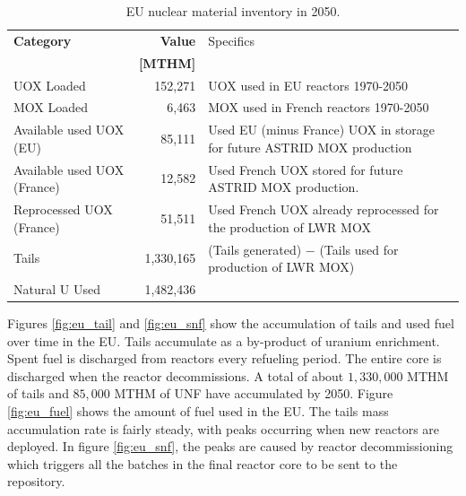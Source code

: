 \begin{table}[h]
	\centering
        \caption{\gls{EU} nuclear material inventory in 2050.}
\begin{tabularx}{\textwidth}{XrX}
			\hline
                        \textbf{Category} & \textbf{Value} & Specifics \\
                                          & \textbf{[MTHM]} & \\ \hline
                        UOX Loaded  & 152,271 & UOX used in EU reactors 1970-2050\\ 
			MOX Loaded  & 6,463  & MOX used in French reactors 1970-2050\\
                        Available used UOX (EU)  & 85,111  & Used EU (minus France) 
                                UOX in storage for future ASTRID MOX 
                                production\\
                        Available used UOX (France) & 
                                12,582  & Used French UOX stored for 
                                future ASTRID MOX production. \\
                                Reprocessed UOX (France) & 51,511 & Used French UOX already reprocessed for the production of LWR MOX \\
			Tails  & 1,330,165  & (Tails generated) $-$ (Tails used for production of LWR MOX) \\ 
			Natural U Used  & 1,482,436  & \\ \hline
		\end{tabularx}
		
		\label{tab:sim_result1}
\end {table}
\FloatBarrier


Figures \ref{fig:eu_tail} and \ref{fig:eu_snf} show the 
accumulation of tails and used fuel over time in the \gls{EU}.
Tails accumulate as a by-product of uranium enrichment. 
Spent fuel is discharged from reactors every refueling period.
The entire core is discharged when the reactor decommissions.
A total of about $1,330,000$ MTHM of tails and $85,000$ MTHM of
\gls{UNF} have accumulated by 2050.
Figure \ref{fig:eu_fuel} shows the amount of fuel used in the \gls{EU}. The 
tails mass accumulation rate is fairly steady, with peaks occurring when new 
reactors are deployed.
In figure \ref{fig:eu_snf}, the peaks are caused by reactor decommissioning which 
triggers all the batches in the final reactor core to be sent to the repository.

